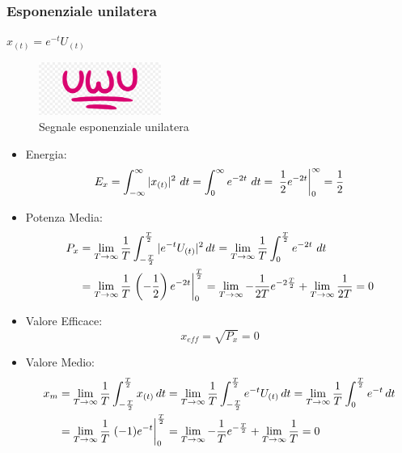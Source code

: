         
        \subsubsection{Esponenziale unilatera}
        $x_{(t)} = e^{-t}U_{(t)}$
        \begin{figure}[H]
            \centering
            \includegraphics[width=4cm]{media/uwu.png}
            \caption{Segnale esponenziale unilatera}
            \label{fig:segnale esponenziale unilatera}
        \end{figure}        
        \begin{itemize}
            \item {Energia:
                \[
                    E_{x} = \int_{-\infty}^{\infty} |x_{(t)}|^2 \ dt = \int_{0}^{\infty} e^{-2t}\ dt = \eval*{\frac{1}{2} e^{-2t}}_{0}^{\infty} = \frac{1}{2} 
                \]
            }
            \item {Potenza Media:
                \begin{align}
                    P_{x} & =\lim_{T\rightarrow\infty}  \frac{1}{T} \int_{-\frac{T}{2}}^{\frac{T}{2}}  |e^{-t}U_{(t)}|^2 \,dt =\lim_{T\rightarrow\infty} \frac{1}{T} \int_{0}^{\frac{T}{2}} e^{-2t}\ dt \nonumber \\
                          & = \lim_{T\rightarrow\infty} \frac{1}{T} \eval*{\left(-\frac{1}{2}\right) e^{-2t}}_{0}^{\frac{T}{2}} =\lim_{T\rightarrow\infty}-\frac{1}{2T} e^{-2\frac{T}{2}} + \lim_{T\rightarrow\infty} \frac{1}{2T} = 0 \nonumber 
                \end{align}
            }
            \item {Valore Efficace:
                \[
                    x_{eff} = \sqrt{P_{x}} = 0 
                \]
            }
            \item {Valore Medio:
                    \begin{align}
                        x_{m} & = \lim_{T\rightarrow\infty} \frac{1}{T} \int_{-\frac{T}{2}}^{\frac{T}{2}}  x_{(t)} \,dt =\lim_{T\rightarrow\infty} \frac{1}{T} \int_{-\frac{T}{2}}^{\frac{T}{2}} e^{-t}U_{(t)}\,dt = \lim_{T\rightarrow\infty} \frac{1}{T} \int_{0}^{\frac{T}{2}} e^{-t}\,dt \nonumber \\
                              & = \lim_{T\rightarrow\infty} \frac{1}{T} \eval*{(-1) e^{-t}}_{0}^{\frac{T}{2}} =  \lim_{T\rightarrow\infty}-\frac{1}{T} e^{-\frac{T}{2}} + \lim_{T\rightarrow\infty} \frac{1}{T} = 0 \nonumber
                    \end{align}
            }
        \end{itemize}
        
